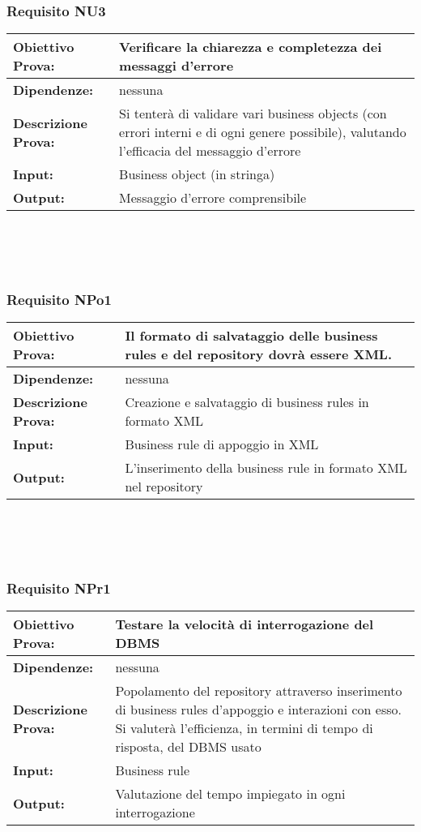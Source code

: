 \subsubsection{Requisito NU3}
\begin{tabular}{||p{4cm}||p{8cm}||}
\hline
{\textbf{Obiettivo Prova:}}& Verificare la chiarezza e completezza dei messaggi d'errore\\ \hline
{\textbf{Dipendenze:}}& nessuna \\ \hline
{\textbf{Descrizione Prova:}}& Si tenter\`a di validare vari business objects (con errori interni e di ogni genere possibile), valutando l'efficacia del messaggio d'errore \\ \hline
{\textbf{Input:}}&  Business object (in stringa) \\ \hline %
{\textbf{Output:}}& Messaggio d'errore comprensibile \\ \hline
\end{tabular} \\
\\
\\
\subsubsection{Requisito NPo1}
\begin{tabular}{||p{4cm}||p{8cm}||}
\hline
{\textbf{Obiettivo Prova:}}& Il formato di salvataggio delle business rules e del repository dovr\`a essere XML.\\ \hline
{\textbf{Dipendenze:}}& nessuna \\ \hline
{\textbf{Descrizione Prova:}}&  Creazione e salvataggio di business rules in formato XML  \\ \hline
{\textbf{Input:}}&  Business rule di appoggio in XML \\ \hline
{\textbf{Output:}}& L'inserimento della business rule in formato XML nel repository \\ \hline
\end{tabular} \\
\\
\\
\subsubsection{Requisito NPr1}
\begin{tabular}{||p{4cm}||p{8cm}||}
\hline
{\textbf{Obiettivo Prova:}}& Testare la velocit\`a di interrogazione del DBMS\\ \hline
{\textbf{Dipendenze:}}& nessuna \\ \hline
{\textbf{Descrizione Prova:}}& Popolamento del repository attraverso inserimento di business rules d'appoggio e interazioni con esso. Si valuter\`a l'efficienza, in termini di tempo di risposta, del DBMS usato  \\ \hline
{\textbf{Input:}}& Business rule \\ \hline
{\textbf{Output:}}& Valutazione del tempo impiegato in ogni interrogazione \\ \hline
\end{tabular} \\
\\
\\
